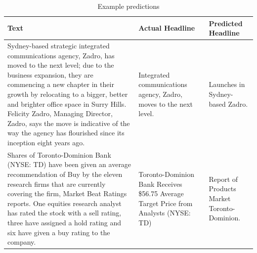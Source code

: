 \begin{center}
\begin{table}[!htb]
\centering
\caption{Example predictions}
\label{tab:results-table}
\begin{tabular}{|l|l|l|}
\hline
\textbf{Text} & \textbf{Actual Headline} & \textbf{Predicted Headline} \\ \hline

\begin{minipage}[t]{0.4\columnwidth}%
Sydney-based strategic integrated communications agency, Zadro, has moved to the next level; due to the business expansion, they are commencing a new chapter in their growth by relocating to a bigger, better and brighter office space in Surry Hills. Felicity Zadro, Managing Director, Zadro, says the move is indicative of the way the agency has flourished since its inception eight years ago.             
\end{minipage}
 & 
\begin{minipage}[t]{0.3\columnwidth}%
 Integrated communications agency, Zadro, moves to the next level. 
\end{minipage}
 & 
\begin{minipage}[t]{0.3\columnwidth}%
 Launches in Sydney-based Zadro. 
\end{minipage}  \\ \hline


\begin{minipage}[t]{0.4\columnwidth}%
Shares of Toronto-Dominion Bank (NYSE: TD) have been given an average recommendation of Buy by the eleven research firms that are currently covering the firm, Market Beat Ratings reports. One equities research analyst has rated the stock with a sell rating, three have assigned a hold rating and six have given a buy rating to the company.           
\end{minipage}
 & 
\begin{minipage}[t]{0.3\columnwidth}%
Toronto-Dominion Bank Receives \$56.75 Average Target Price from Analysts (NYSE: TD) 
\end{minipage}
 & 
\begin{minipage}[t]{0.3\columnwidth}%
Report of Products Market Toronto-Dominion. 
\end{minipage}  \\ \hline



\end{tabular}
\end{table}
\end{center}
